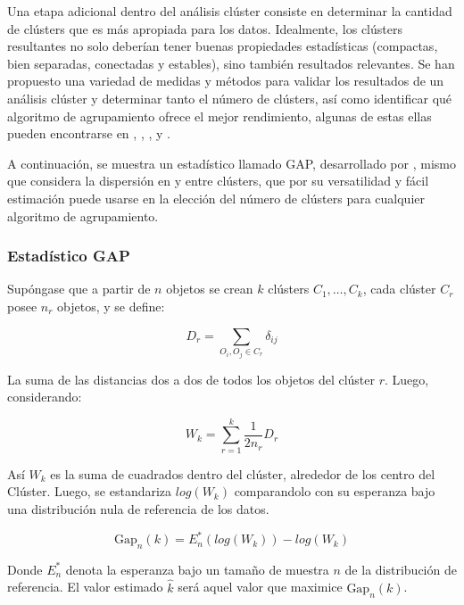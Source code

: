 \documentclass[12pt,oneside]{book}\usepackage[]{graphicx}\usepackage[]{color}
\theoremstyle{definition} %
\begin{document}
Una etapa adicional dentro del análisis clúster consiste en determinar la cantidad de clústers que es más apropiada para los datos. Idealmente, los clústers resultantes no solo deberían tener buenas propiedades estadísticas (compactas, bien separadas, conectadas y estables), sino también resultados relevantes. Se han propuesto una variedad de medidas y métodos para validar los resultados de un análisis clúster y determinar tanto el número de clústers, así como identificar qué algoritmo de agrupamiento ofrece el mejor rendimiento, algunas de estas ellas pueden encontrarse en \citeauthor{fraley1998many} \citeyear{fraley1998many}, \citeauthor{duda2001pattern} \citeyear{duda2001pattern}, \citeauthor{salvador2004determining} , y \citeauthor{kerr2001bootstrapping} \citeyear{kerr2001bootstrapping}. 


A continuación, se muestra un estadístico llamado GAP, desarrollado por \citeauthor{tibshirani2001estimating} \citeyear{tibshirani2001estimating}, mismo que considera la dispersión en y entre clústers, que por su versatilidad y fácil estimación puede usarse en la elección del número de clústers para cualquier algoritmo de agrupamiento.

\subsubsection{Estadístico GAP}

Supóngase que a partir de $n$ objetos se crean $k$ clústers $C_1,\dots,C_k$, cada clúster $C_r$ posee $n_r$ objetos, y se define:

\[
D_r = \sum_{O_i,O_j\in C_r} \delta_{ij} 
\]

La suma de las distancias dos a dos de todos los objetos del clúster $r$. Luego, considerando: 

\[
W_k = \sum_{r=1}^k \frac{1}{2n_r}D_r
\]

Así $W_k$ es la suma de cuadrados dentro del clúster, alrededor de los centro del Clúster. Luego, se estandariza  $log(W_k)$ comparandolo con su esperanza bajo una distribución nula de referencia de los datos.

\[
\text{Gap}_n(k) = E_n^*(log(W_k))-log(W_k)
\]

Donde $E_n^*$ denota la esperanza bajo un tamaño de muestra $n$ de la distribución de referencia. El valor estimado $\hat k$ será aquel valor que maximice $\text{Gap}_n(k)$.


\end{document}
